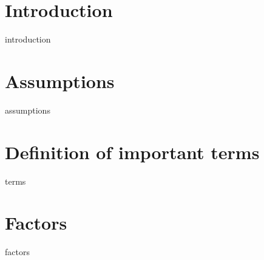 
\section{Introduction}
{introduction}

\section{Assumptions}
{assumptions}

\section{Definition of important terms}
\begin{labeling}{\hspace{3cm}}
{terms}
\end{labeling}

\section{Factors}
{factors}
